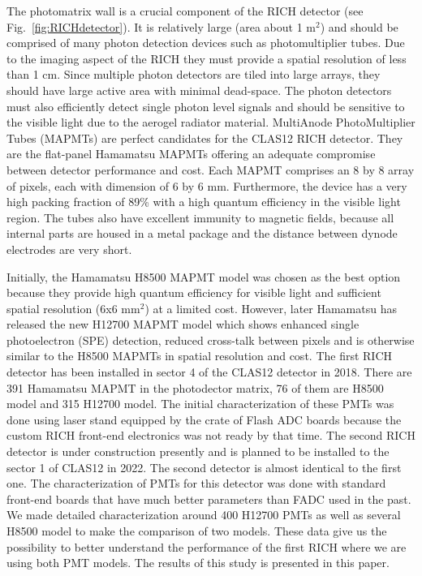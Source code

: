 The photomatrix  wall is a crucial component of the RICH detector (see Fig.~\ref{fig:RICHdetector}). It is relatively large (area about 1 m$^2$) and should be comprised of many photon detection devices such as photomultiplier tubes.
Due to the imaging aspect of the RICH they must provide a spatial resolution of less than 1 cm.
Since multiple photon detectors are tiled into large arrays, they should have large active area with minimal dead-space.
The photon detectors must also efficiently detect single photon level signals and should be sensitive to the visible light due to the aerogel radiator material.
MultiAnode PhotoMultiplier Tubes (MAPMTs) are perfect candidates for the CLAS12 RICH detector.
They are the flat-panel Hamamatsu MAPMTs offering an adequate compromise between detector performance and cost.
Each MAPMT comprises an 8 by 8 array of pixels, each with dimension of 6 by 6 mm.
Furthermore, the device has a very high packing fraction of 89\% with a high quantum efficiency in the visible light region.
The tubes also have excellent immunity to magnetic fields, because all internal parts are housed in a metal package and the distance between dynode electrodes are very short.


Initially, the Hamamatsu H8500 MAPMT model \cite{H8500} was chosen as the best option because they provide high quantum efficiency for visible light and sufficient spatial resolution (6x6 mm$^2$) at a limited cost.  However, later Hamamatsu has released the new H12700 MAPMT model  \cite{H12700} which shows enhanced single photoelectron (SPE) detection, reduced cross-talk between pixels and is otherwise similar to the H8500 MAPMTs in spatial resolution and  cost. The first RICH detector has been installed in sector 4 of the CLAS12 detector in 2018. There are 391 Hamamatsu MAPMT  in the photodector matrix, 76 of them are H8500 model and 315 H12700 model. 
The initial characterization of these PMTs was done using laser stand equipped by the crate of Flash ADC  boards \cite{FADC250} because the custom RICH front-end electronics \cite{RICH_FE} was not ready by that time. The second RICH detector is under construction presently and is planned to be installed to the sector 1 of CLAS12 in 2022. The second detector is almost identical to the first one. The characterization of PMTs for this detector was done with standard front-end boards that have much better parameters than FADC used in the past. We made detailed characterization around 400 H12700 PMTs as well as several H8500 model to make the comparison of two models. These data give us the possibility to better understand the performance of the first RICH where we are using both PMT models. The results of this study is presented in this paper.



